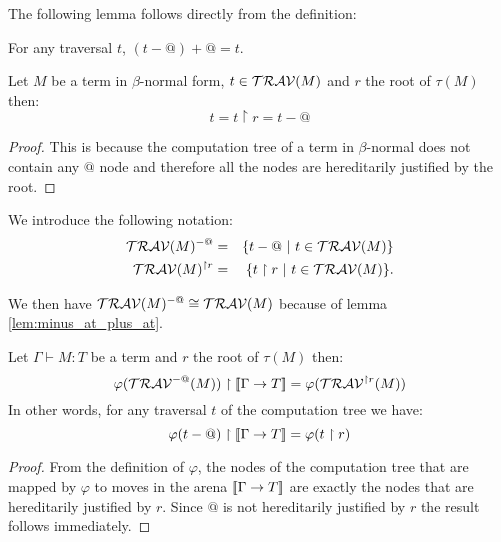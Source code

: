 The following lemma follows directly from the definition:
\begin{lem}
\label{lem:minus_at_plus_at} For any traversal $t$, $(t-@)+@=t$.
\end{lem}

\begin{lem}
Let $M$ be a term in $\beta$-normal form, $t \in
\mathcal{TRAV}(M)$ and $r$ the root of $\tau(M)$ then:
$$t = t \upharpoonright r = t - @$$
\end{lem}
\begin{proof}
This is because the computation tree of a term in $\beta$-normal
does not contain any $@$ node and therefore all the nodes are
hereditarily justified by the root.
\end{proof}

We introduce the following notation:
\begin{eqnarray*}
\mathcal{TRAV}(M)^{-@} &=& \{ t - @ \ | \  t \in \mathcal{TRAV}(M) \} \\
\mathcal{TRAV}(M)^{\upharpoonright r} &=& \{ t  \upharpoonright r \ | \  t  \in \mathcal{TRAV}(M) \} .
\end{eqnarray*}

We then have $\mathcal{TRAV}(M)^{-@} \cong \mathcal{TRAV}(M)$ because of lemma \ref{lem:minus_at_plus_at}.

\begin{lem} Let $\Gamma \vdash M :T$ be a term and $r$ the root of $\tau(M)$ then:
\label{lem:varphi_filter}
$$ \varphi(\mathcal{TRAV}^{-@}(M)) \upharpoonright {[\![\Gamma \rightarrow T ]\!]} = \varphi(\mathcal{TRAV}^{\upharpoonright r}(M)) $$
In other words, for any traversal $t$ of the computation tree we have:
$$\varphi(t-@) \upharpoonright {[\![\Gamma \rightarrow T ]\!]} = \varphi(t\upharpoonright r)$$
\end{lem}
\begin{proof}
    From the definition of $\varphi$, the nodes of the computation tree that are mapped by $\varphi$
    to moves in the arena ${[\![ \Gamma \rightarrow T ]\!]}$ are exactly the nodes that are hereditarily justified by $r$.
    Since $@$ is not hereditarily justified by $r$ the result follows immediately.
\end{proof}

